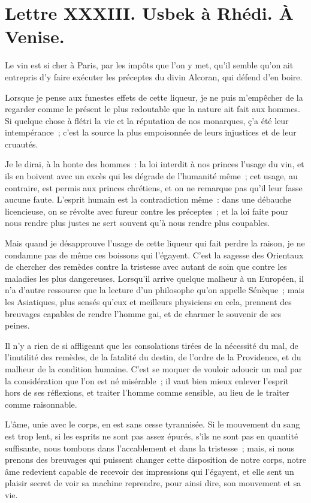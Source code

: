 \documentclass[french,twoside]{book} %
\newcommand{\dateline}[1]{\medskip{\RaggedLeft{#1}\par}\bigskip}
\begin{document}
\dateline{À Paris, le 17 de la lune de Chalval, 1712}
\section[{Lettre XXXIII. Usbek à Rhédi. À Venise.}]{Lettre XXXIII. Usbek à Rhédi. À Venise.}\renewcommand{\leftmark}{Lettre XXXIII. Usbek à Rhédi. À Venise.}

\noindent Le vin est si cher à Paris, par les impôts que l’on y met, qu’il semble qu’on ait entrepris d’y faire exécuter les préceptes du divin Alcoran, qui défend d’en boire.\par
Lorsque je pense aux funestes effets de cette liqueur, je ne puis m’empêcher de la regarder comme le présent le plus redoutable que la nature ait fait aux hommes. Si quelque chose à flétri la vie et la réputation de nos monarques, ç’a été leur intempérance ; c’est la source la plus empoisonnée de leurs injustices et de leur cruautés.\par
Je le dirai, à la honte des hommes : la loi interdit à nos princes l’usage du vin, et ils en boivent avec un excès qui les dégrade de l’humanité même ; cet usage, au contraire, est permis aux princes chrétiens, et on ne remarque pas qu’il leur fasse aucune faute. L’esprit humain est la contradiction même : dans une débauche licencieuse, on se révolte avec fureur contre les préceptes ; et la loi faite pour nous rendre plus justes ne sert souvent qu’à nous rendre plus coupables.\par
Mais quand je désapprouve l’usage de cette liqueur qui fait perdre la raison, je ne condamne pas de même ces boissons qui l’égayent. C’est la sagesse des Orientaux de chercher des remèdes contre la tristesse avec autant de soin que contre les maladies les plus dangereuses. Lorsqu’il arrive quelque malheur à un Européen, il n’a d’autre ressource que la lecture d’un philosophe qu’on appelle Sénèque ; mais les Asiatiques, plus sensés qu’eux et meilleurs physiciens en cela, prennent des breuvages capables de rendre l’homme gai, et de charmer le souvenir de ses peines.\par
Il n’y a rien de si affligeant que les consolations tirées de la nécessité du mal, de l’inutilité des remèdes, de la fatalité du destin, de l’ordre de la Providence, et du malheur de la condition humaine. C’est se moquer de vouloir adoucir un mal par la considération que l’on est né misérable ; il vaut bien mieux enlever l’esprit hors de ses réflexions, et traiter l’homme comme sensible, au lieu de le traiter comme raisonnable.\par
L’âme, unie avec le corps, en est sans cesse tyrannisée. Si le mouvement du sang est trop lent, si les esprits ne sont pas assez épurés, s’ils ne sont pas en quantité suffisante, nous tombons dans l’accablement et dans la tristesse ; mais, si nous prenons des breuvages qui puissent changer cette disposition de notre corps, notre âme redevient capable de recevoir des impressions qui l’égayent, et elle sent un plaisir secret de voir sa machine reprendre, pour ainsi dire, son mouvement et sa vie.\par
\end{document}
